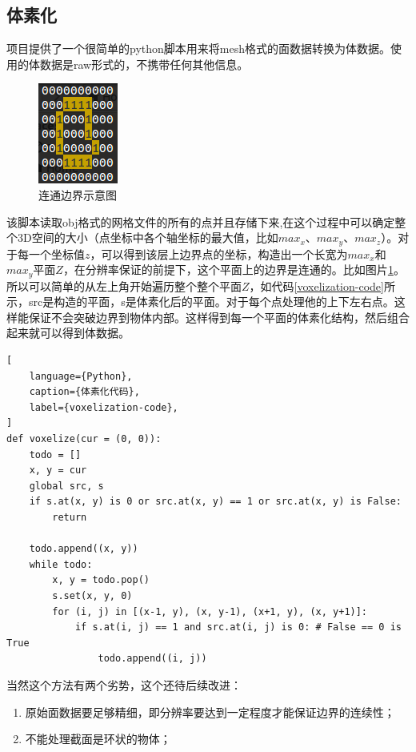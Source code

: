 \subsection{体素化}
项目提供了一个很简单的python脚本用来将mesh格式的面数据转换为体数据。使用的体数据是raw形式的，不携带任何其他信息。
\begin{figure}[h!]
    \centering
    \includegraphics[width=90bp]{figure/connected_boundary.png}
    \caption{连通边界示意图}
    \label{connected-boundary}
\end{figure}
该脚本读取obj格式的网格文件的所有的点并且存储下来,在这个过程中可以确定整个3D空间的大小（点坐标中各个轴坐标的最大值，比如$max_x$、$max_y$、$max_z$）。对于每一个坐标值$z$，可以得到该层上边界点的坐标，构造出一个长宽为$max_x$和$max_y$平面$Z$，在分辨率保证的前提下，这个平面上的边界是连通的。比如图片\ref{connected-boundary}。所以可以简单的从左上角开始遍历整个整个平面$Z$，如代码\ref{voxelization-code}所示，src是构造的平面，s是体素化后的平面。对于每个点处理他的上下左右点。这样能保证不会突破边界到物体内部。这样得到每一个平面的体素化结构，然后组合起来就可以得到体数据。
\begin{lstlisting}[
    language={Python},
    caption={体素化代码},
    label={voxelization-code},
]
def voxelize(cur = (0, 0)):
    todo = []
    x, y = cur
    global src, s
    if s.at(x, y) is 0 or src.at(x, y) == 1 or src.at(x, y) is False:
        return
    
    todo.append((x, y))
    while todo:
        x, y = todo.pop()
        s.set(x, y, 0)
        for (i, j) in [(x-1, y), (x, y-1), (x+1, y), (x, y+1)]:
            if s.at(i, j) == 1 and src.at(i, j) is 0: # False == 0 is True
                todo.append((i, j))
\end{lstlisting}

当然这个方法有两个劣势，这个还待后续改进：
\begin{enumerate}
    \item 原始面数据要足够精细，即分辨率要达到一定程度才能保证边界的连续性；
    \item 不能处理截面是环状的物体；
\end{enumerate}

